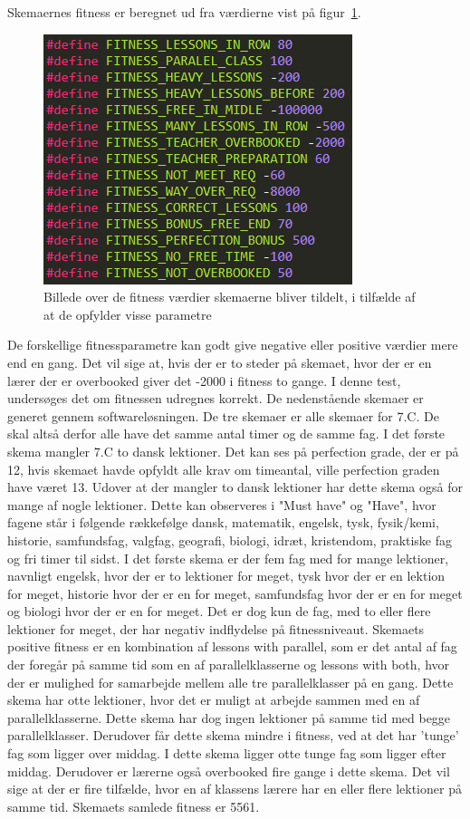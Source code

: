 
Skemaernes fitness er beregnet ud fra værdierne vist på figur~\ref{fitnessvalues}.

\begin{figure}[!h]
\includegraphics[scale = 2]{partials/graphics/fitness.png}
\caption{Billede over de fitness værdier skemaerne bliver tildelt, i tilfælde af at de opfylder visse parametre}
\label{fitnessvalues}
\end{figure}
De forskellige fitnessparametre kan godt give negative eller positive værdier mere end en gang. Det vil sige at, hvis der er to steder på skemaet, hvor der er en lærer der er overbooked giver det -2000 i fitness to gange.
I denne test, undersøges det om fitnessen udregnes korrekt. De nedenstående skemaer er generet gennem softwareløsningen. De tre skemaer er alle skemaer for 7.C. De skal altså derfor alle have det samme antal timer og de samme fag. 
I det første skema mangler 7.C to dansk lektioner. Det kan ses på perfection grade, der er på 12, hvis skemaet havde opfyldt alle krav om timeantal, ville perfection graden have været 13. Udover at der mangler to dansk lektioner har dette skema også for mange af nogle lektioner. Dette kan observeres i "Must have" og "Have", hvor fagene står i følgende rækkefølge dansk, matematik, engelsk, tysk, fysik/kemi, historie, samfundsfag, valgfag, geografi, biologi, idræt, kristendom, praktiske fag og fri timer til sidst. I det første skema er der fem fag med for mange lektioner, navnligt engelsk, hvor der er to lektioner for meget, tysk hvor der er en lektion for meget, historie hvor der er en for meget, samfundsfag hvor der er en for meget og biologi hvor der er en for meget. Det er dog kun de fag, med to eller flere lektioner for meget, der har negativ indflydelse på fitnessniveaut.
Skemaets positive fitness er en kombination af lessons with parallel, som er det antal af fag der foregår på samme tid som en af parallelklasserne og lessons with both, hvor der er mulighed for samarbejde mellem alle tre parallelklasser på en gang. Dette skema har otte lektioner, hvor det er muligt at arbejde sammen med en af parallelklasserne. Dette skema har dog ingen lektioner på samme tid med begge parallelklasser. Derudover får dette skema mindre i fitness, ved at det har ’tunge’ fag som ligger over middag. I dette skema ligger otte tunge fag som ligger efter middag. Derudover er lærerne også overbooked fire gange i dette skema. Det vil sige at der er fire tilfælde, hvor en af klassens lærere har en eller flere lektioner på samme tid. Skemaets samlede fitness er 5561. 
